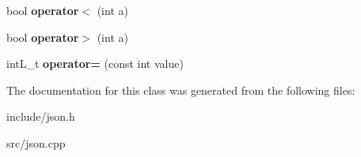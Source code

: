 \begin{DoxyCompactItemize}
\item 
\hypertarget{classjsonInt__t_aba5de3bec5dd6dac0d7c58ac00219169}{bool {\bfseries operator$<$} (int a)}\label{classjsonInt__t_aba5de3bec5dd6dac0d7c58ac00219169}

\item 
\hypertarget{classjsonInt__t_af39e05fee3287910588b36a3fa4b6905}{bool {\bfseries operator$>$} (int a)}\label{classjsonInt__t_af39e05fee3287910588b36a3fa4b6905}

\item 
\hypertarget{classjsonInt__t_a0b2da1510a744b12511e6605b7713657}{int\-L\-\_\-t {\bfseries operator=} (const int value)}\label{classjsonInt__t_a0b2da1510a744b12511e6605b7713657}

\end{DoxyCompactItemize}


\-The documentation for this class was generated from the following files\-:\begin{DoxyCompactItemize}
\item 
include/json.\-h\item 
src/json.\-cpp\end{DoxyCompactItemize}
